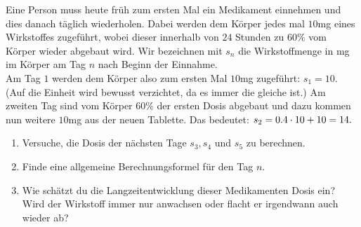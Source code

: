 \documentclass[11pt,oneside]{article}
\begin{document}
	\begin{aufgabe}
		Eine Person muss heute früh zum ersten Mal ein Medikament einnehmen und dies danach täglich wiederholen. Dabei werden dem Körper jedes mal $10$mg eines Wirkstoffes zugeführt, wobei dieser innerhalb von $24$ Stunden zu $60\%$ vom Körper wieder abgebaut wird. Wir bezeichnen mit $s_n$ die Wirkstoffmenge in mg im Körper am Tag $n$ nach Beginn der Einnahme.\\
		Am Tag $1$ werden dem Körper also zum ersten Mal $10$mg zugeführt: $s_1=10$. (Auf die Einheit wird bewusst verzichtet, da es immer die gleiche ist.) Am zweiten Tag sind vom Körper $60\%$ der ersten Dosis abgebaut und dazu kommen nun weitere $10$mg aus der neuen Tablette. Das bedeutet: $s_2=0.4\cdot 10 +10=14.$
		\begin{enumerate}[label=\alph*)]
			\item Versuche, die Dosis der nächsten Tage $s_3, s_4$ und $s_5$ zu berechnen.
			\item Finde eine allgemeine Berechnungsformel für den Tag $n$.
			\item Wie schätzt du die Langzeitentwicklung dieser Medikamenten Dosis ein? Wird der Wirkstoff immer nur anwachsen oder flacht er irgendwann auch wieder ab?
		\end{enumerate}
	\end{aufgabe}
\end{document}
